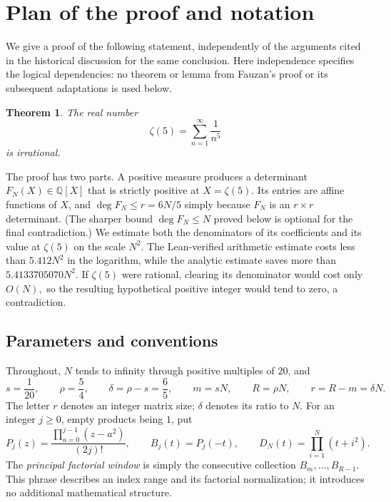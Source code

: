 \documentclass[11pt,letterpaper]{article}
\newtheorem{theorem}{Theorem}[section]
\theoremstyle{definition}
\newcommand{\Q}{\mathbb Q}
\begin{document}
\section{Plan of the proof and notation}\label{sec:plan}

We give a proof of the following statement, independently of the
arguments cited in the historical discussion for the same conclusion.
Here independence specifies the logical dependencies: no theorem or lemma
from Fauzan's proof or its subsequent adaptations is used below.

\begin{theorem}\label{thm:main}
The real number
\[
  \zeta(5)=\sum_{n=1}^{\infty}\frac1{n^5}
\]
is irrational.
\end{theorem}

The proof has two parts. A positive measure produces a determinant
$F_N(X)\in\Q[X]$ that is strictly positive at $X=\zeta(5)$. Its entries are
affine functions of $X$, and $\deg F_N\le r=6N/5$ simply because
$F_N$ is an $r\times r$ determinant. (The sharper bound $\deg F_N\le N$
proved below is optional for the final contradiction.) We estimate both
the denominators of its coefficients and its value at $\zeta(5)$ on the
scale $N^2$. The Lean-verified arithmetic estimate costs less than
$5.412N^2$ in the logarithm, while the analytic estimate saves more than
$5.4133705070N^2$. If $\zeta(5)$ were rational, clearing its denominator
would cost only $O(N),$ so the resulting hypothetical positive integer would tend to zero, a contradiction.

\subsection{Parameters and conventions}
Throughout, $N$ tends to infinity through positive multiples of $20$, and
\begin{equation}\label{eq:fixed-parameters}
 s=\frac1{20},\qquad \rho=\frac54,\qquad
 \delta=\rho-s=\frac65,\qquad
 m=sN,\qquad R=\rho N,\qquad r=R-m=\delta N.
\end{equation}
The letter $r$ denotes an integer matrix size; $\delta$ denotes its ratio to
$N$. For an integer $j\ge0$, empty products being $1$, put
\begin{equation}\label{eq:basic-polynomials}
 P_j(z)=\frac{\prod_{a=0}^{j-1}(z-a^2)}{(2j)!},\qquad
 B_j(t)=P_j(-t),\qquad
 D_N(t)=\prod_{i=1}^{N}(t+i^2).
\end{equation}
The \emph{principal factorial window} is simply the consecutive collection
$B_m,\ldots,B_{R-1}$. This phrase describes an index range and its factorial
normalization; it introduces no additional mathematical structure.
\end{document}
